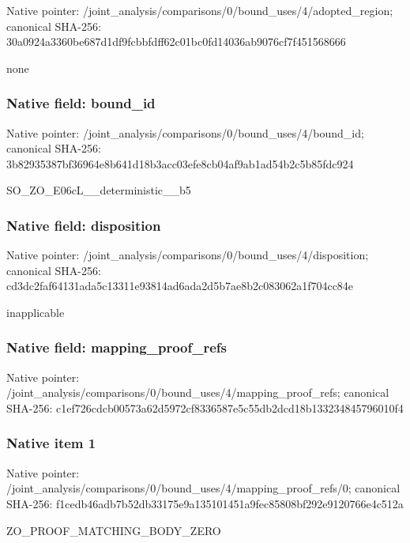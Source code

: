 \documentclass[10pt,a4paper]{article}
\begin{document}
Native pointer: /joint\_analysis/comparis\allowbreak{}ons/0/bound\_uses/4/adopt\allowbreak{}ed\_region; canonical SHA-256: 30a0924a3360be687d1df9fc\allowbreak{}bbfdff62c01bc0fd14036ab9\allowbreak{}076cf7f451568666


none


\subsubsection{Native field: bound\_id}


Native pointer: /joint\_analysis/comparis\allowbreak{}ons/0/bound\_uses/4/bound\allowbreak{}\_id; canonical SHA-256: 3b82935387bf36964e8b641d\allowbreak{}18b3acc03efe8cb04af9ab1a\allowbreak{}d54b2c5b85fdc924


SO\_ZO\_E06cL\_\_deterministic\_\_b5


\subsubsection{Native field: disposition}


Native pointer: /joint\_analysis/comparis\allowbreak{}ons/0/bound\_uses/4/dispo\allowbreak{}sition; canonical SHA-256: cd3dc2faf64131ada5c13311\allowbreak{}e93814ad6ada2d5b7ae8b2c0\allowbreak{}83062a1f704cc84e


inapplicable


\subsubsection{Native field: mapping\_proof\_refs}


Native pointer: /joint\_analysis/comparis\allowbreak{}ons/0/bound\_uses/4/mappi\allowbreak{}ng\_proof\_refs; canonical SHA-256: c1ef726cdcb00573a62d5972\allowbreak{}cf8336587e5c55db2dcd18b1\allowbreak{}33234845796010f4



\subsubsection{Native item 1}


Native pointer: /joint\_analysis/comparis\allowbreak{}ons/0/bound\_uses/4/mappi\allowbreak{}ng\_proof\_refs/0; canonical SHA-256: f1cedb46adb7b52db33175e9\allowbreak{}a135101451a9fec85808bf29\allowbreak{}2e9120766e4c512a


ZO\_PROOF\_MATCHING\_BODY\_ZERO
\end{document}
